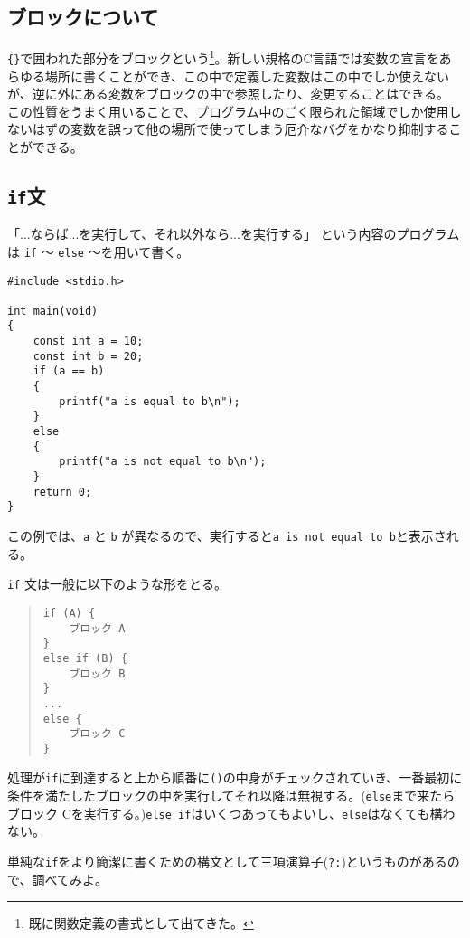\subsection{ブロックについて}
\texttt{\{\}}で囲われた部分をブロックという\footnote{既に関数定義の書式として出てきた。}。新しい規格のC言語では変数の宣言をあらゆる場所に書くことができ、この中で定義した変数はこの中でしか使えないが、逆に外にある変数をブロックの中で参照したり、変更することはできる。
この性質をうまく用いることで、プログラム中のごく限られた領域でしか使用しないはずの変数を誤って他の場所で使ってしまう厄介なバグをかなり抑制することができる。

\subsection{\texttt{if}文}
「...ならば...を実行して、それ以外なら...を実行する」
という内容のプログラムは \texttt{if} 〜 \texttt{else} 〜を用いて書く。
\begin{reidai}\label{ex:if}
    \begin{verbatim}
#include <stdio.h>

int main(void)
{
    const int a = 10;
    const int b = 20;
    if (a == b)
    {
        printf("a is equal to b\n");
    }
    else
    {
        printf("a is not equal to b\n");
    }
    return 0;
}
\end{verbatim}
\end{reidai} \noindent
この例では、\texttt{a} と \texttt{b} が異なるので、実行すると\texttt{a is not equal to b}と表示される。

\texttt{if} 文は一般に以下のような形をとる。
\begin{quote}
    \begin{verbatim}
if (A) {
    ブロック A
}
else if (B) {
    ブロック B
}
...
else {
    ブロック C
}
\end{verbatim}
\end{quote} \noindent
処理が\texttt{if}に到達すると上から順番に\texttt{()}の中身がチェックされていき、一番最初に条件を満たしたブロックの中を実行してそれ以降は無視する。(\texttt{else}まで来たらブロック Cを実行する。)\texttt{else if}はいくつあってもよいし、\texttt{else}はなくても構わない。

単純な\texttt{if}をより簡潔に書くための構文として三項演算子(\texttt{?:})というものがあるので、調べてみよ。

